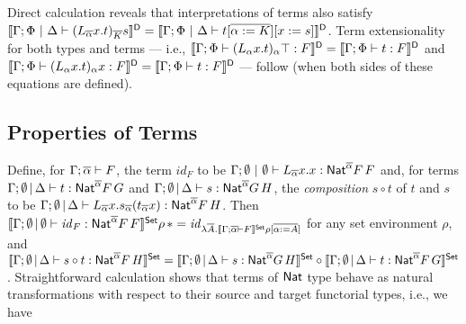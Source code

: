 \documentclass[runningheads]{llncs}
\renewcommand{\id}{\mathit{id}}
\renewcommand{\id}{\mathit{id}}
\begin{document}
Direct calculation reveals that interpretations of terms also
satisfy
$\llbracket{\Gamma; \Phi~|~\Delta \vdash
  (L_{\overline{\alpha}}x.t)_{\overline{K}}s}\rrbracket^{\mathsf D} = \llbracket{\Gamma; \Phi~|~\Delta
  \vdash t [\overline{\alpha := K}][x := s]}\rrbracket^{\mathsf D}$.
Term extensionality for both types and terms --- i.e.,
$\llbracket{\Gamma;\Phi\vdash (L_\alpha x.t)_\alpha \top : F}\rrbracket^{\mathsf D} =
\llbracket{\Gamma;\Phi \vdash t : F}\rrbracket^{\mathsf D}$ and
$\llbracket{\Gamma;\Phi\vdash (L_\alpha x.t)_\alpha x : F}\rrbracket^{\mathsf D} =
\llbracket{\Gamma;\Phi \vdash t : F}\rrbracket^{\mathsf D}$
--- follow (when both sides of these equations are defined).

\vspace*{-0.1in}

\subsection{Properties of Terms}\label{sec:Nat-type-terms}

\vspace*{-0.05in}

Define, for $\Gamma; \overline{\alpha} \vdash F$, the term $\id_F$ to be
$\Gamma;\emptyset~|~\emptyset \vdash L_{\overline{\alpha}}x.x :
\mathsf{Nat}^{\overline{\alpha}} F\,F$ and, for terms $\Gamma; \emptyset \,|\,
\Delta \vdash t: \mathsf{Nat}^{\overline{\alpha}} F\,G$ and $\Gamma; \emptyset
\,|\, \Delta \vdash s: \mathsf{Nat}^{\overline{\alpha}} G\,H$, the {\em
  composition} $s \circ t$ of $t$ and $s$ to be $\Gamma;
\emptyset\,|\, \Delta \vdash L_{\overline{\alpha}}
x. s_{\overline{\alpha}}(t_{\overline{\alpha}}x):
\mathsf{Nat}^{\overline{\alpha}} F\,H$. Then $\setsem{\Gamma; \emptyset \,|\,
  \emptyset \vdash \id_{F} : \Nat^{\ol{\alpha}} F\,F} \rho\, \ast =
\id_{\lambda \ol{A}. \setsem{\Gamma; \ol{\alpha} \vdash F} \rho
  [\ol{\alpha := A}]}$ for any set environment $\rho$, and
$\llbracket{\Gamma; \emptyset \,|\, \Delta \vdash s \circ t:
  \mathsf{Nat}^{\overline{\alpha}} F\,H}\rrbracket^{\mathsf{Set}} = \llbracket{\Gamma; \emptyset \,|\,
  \Delta \vdash s: \mathsf{Nat}^{\overline{\alpha}} G\,H}\rrbracket^{\mathsf{Set}} \circ
\llbracket{\Gamma; \emptyset \,|\, \Delta \vdash t:
  \mathsf{Nat}^{\overline{\alpha}} F\,G}\rrbracket^{\mathsf{Set}}$. Straightforward calculation shows
that terms of $\mathsf{Nat}$ type behave as natural transformations with
respect to their source and target functorial types, i.e., we have
\end{document}
